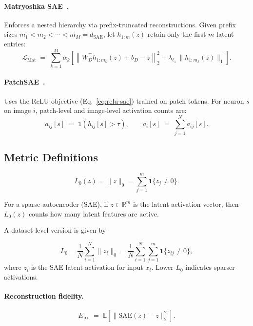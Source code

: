 \paragraph{Matryoshka SAE~\citep{bussmann2025matryoshka,zaremba2025msae}.}
Enforces a nested hierarchy via prefix-truncated reconstructions. Given prefix sizes $m_1 < m_2 < \cdots < m_M = d_{\mathrm{SAE}}$, let $h_{1:m}(z)$ retain only the first $m$ latent entries:
\begin{equation}
\mathcal{L}_{\mathrm{Mat}}
\;=\;
\sum_{k=1}^{M} \alpha_k
\left[
\left\|W_D^{\top} h_{1:m_k}(z) + b_D - z\right\|_2^2
+ \lambda_{\ell_1}\,\|h_{1:m_k}(z)\|_1
\right].
\label{eq:matryoshka-loss}
\end{equation}
 
\paragraph{PatchSAE~\citep{lim2024patchsae}.}
Uses the ReLU objective (Eq.~\eqref{eq:relu-sae}) trained on patch tokens. For neuron $s$ on image $i$, patch-level and image-level activation counts are:
\begin{equation}
a_{ij}[s] \;=\; \mathbb{1}\!\left(h_{ij}[s] > \tau\right),
\qquad
a_i[s] \;=\; \sum_{j=1}^{N} a_{ij}[s].
\label{eq:activation-counts}
\end{equation}
 
 
\subsection{Metric Definitions}
\label{app:metrics}

\[
L_0(z) = \|z\|_0 = \sum_{j=1}^{m} \mathbf{1}\{z_j \neq 0\}.
\]

For a sparse autoencoder (SAE), if \(z \in \mathbb{R}^m\) is the latent activation vector, then \(L_0(z)\) counts how many latent features are active.

A dataset-level version is given by

\begin{equation}
L_0
=
\frac{1}{N}
\sum_{i=1}^{N}
\|z_i\|_0
=
\frac{1}{N}
\sum_{i=1}^{N}
\sum_{j=1}^{m}
\mathbf{1}\{z_{ij} \neq 0\},
\end{equation}
where \(z_i\) is the SAE latent activation for input \(x_i\). Lower \(L_0\) indicates sparser activations.
 
\paragraph{Reconstruction fidelity.}
\begin{equation}
E_{\mathrm{rec}} \;=\; \mathbb{E}\!\left[\|\mathrm{SAE}(z) - z\|_2^2\right].
\label{eq:recon-error}
\end{equation}
 

